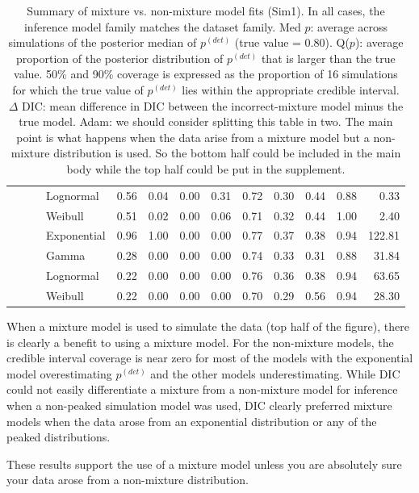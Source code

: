 \documentclass[useAMS,usenatbib,referee,12pt]{article}
\newcommand{\jarad}[1]{{\color{Orange} #1}}
\newcommand{\pdet}{p^{(det)}}
\begin{document}
\begin{table}[ht]
\begin{tabular}{l|l|l|l|cccc|cccc||r}
 & & &   Lognormal & 0.56 & 0.04 & 0.00 & 0.31 & 0.72 & 0.30 & 0.44 & 0.88 & 0.33 \\ 
 & & &   Weibull & 0.51 & 0.02 & 0.00 & 0.06 & 0.71 & 0.32 & 0.44 & 1.00 & 2.40 \\ 
  \cline{3-13}
 & & &   Exponential & 0.96 & 1.00 & 0.00 & 0.00 & 0.77 & 0.37 & 0.38 & 0.94 & 122.81 \\ 
  \cline{3-13}
 & & \parbox[t]{2mm}{} & Gamma & 0.28 & 0.00 & 0.00 & 0.00 & 0.74 & 0.33 & 0.31 & 0.88 & 31.84 \\ 
 & & &   Lognormal & 0.22 & 0.00 & 0.00 & 0.00 & 0.76 & 0.36 & 0.38 & 0.94 & 63.65 \\ 
 & & &   Weibull & 0.22 & 0.00 & 0.00 & 0.00 & 0.70 & 0.29 & 0.56 & 0.94 & 28.30 \\ 
   \hline
\end{tabular}
\caption{Summary of mixture vs. non-mixture model fits (Sim1).  
In all cases, the inference model family matches the dataset family.  
Med $p$: average across simulations of the posterior median of $\pdet$ (true value = 0.80).  
Q($p$): average proportion of the posterior distribution of $\pdet$ that is larger than the true value.  
50\% and 90\% coverage is expressed as the proportion of 16 simulations for which the true value of $\pdet$ lies within the appropriate credible interval.  
$\Delta$ DIC: mean difference in DIC between the incorrect-mixture model minus the true model.
\jarad{Adam: we should consider splitting this table in two. The main point is what happens when the data arise from a mixture model but a non-mixture distribution is used. So the bottom half could be included in the main body while the top half could be put in the supplement.}
}
\label{tbl:sim1}
\end{table}

When a mixture model is used to simulate the data (top half of the figure), there is clearly a benefit to using a mixture model. For the non-mixture models, the credible interval coverage is near zero for most of the models with the exponential model overestimating $\pdet$ and the other models underestimating. 
While DIC could not easily differentiate a mixture from a non-mixture model for inference when a non-peaked simulation model was used, DIC clearly preferred mixture models when the data arose from an exponential distribution or any of the peaked distributions. 

These results support the use of a mixture model unless you are absolutely sure your data arose from a non-mixture distribution.
\end{document}
